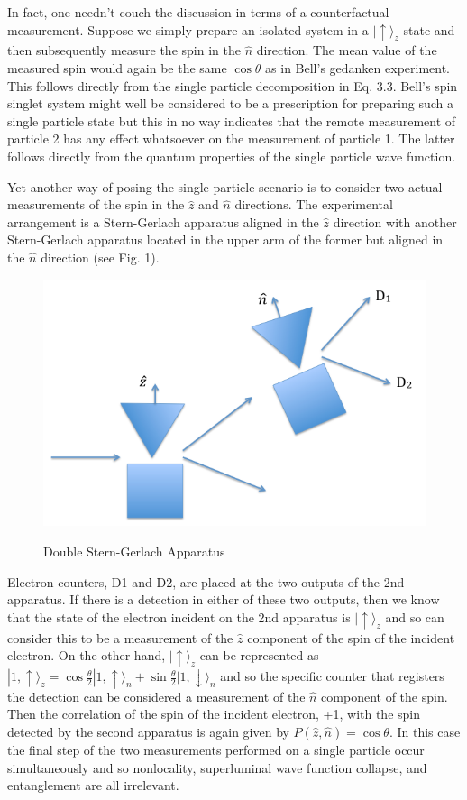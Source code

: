 \documentclass[12pt]{article}
\begin{document}
In fact, one needn't couch the discussion in terms of a counterfactual measurement.  Suppose we simply prepare an isolated system in a 
$|\!\!\uparrow\rangle_z$ state and then subsequently measure the spin in the $\hat{n}$ direction.  The mean value of the measured spin would again be the same $\cos{\theta}$ as in Bell's gedanken experiment.  This follows directly from the single particle decomposition in Eq. 3.3.  Bell's spin singlet system might well be considered to be a prescription for preparing such a single particle state but this in no way indicates that the remote measurement of particle 2 has any effect whatsoever on the measurement of particle 1.  The latter follows directly from the quantum properties of the single particle wave function.

Yet another way of posing the single particle scenario is to consider two actual measurements of the spin in the $\hat{z}$ and $\hat{n}$ directions.  The experimental arrangement is a Stern-Gerlach apparatus aligned in the $\hat{z}$ direction with another Stern-Gerlach apparatus located in the upper arm of the former but aligned in the $\hat{n}$ direction (see Fig. 1). 
\begin{figure}[htb]
\vbox{\hfil\scalebox{1.0}
{\includegraphics{Stern-Gerlach.pdf}}\hfil}
{\caption{\footnotesize{Double Stern-Gerlach Apparatus}}}
\end{figure}
Electron counters, D1 and D2, are placed at the two outputs of the 2nd apparatus.    If there is a detection in either of these two outputs, then we know that the state of the electron incident on the 2nd apparatus is $|\!\!\uparrow \rangle_z$ and so can consider this to be a measurement of the $\hat{z}$ component of the spin of the incident electron.  On the other hand, $|\!\!\uparrow \rangle_z$ can be represented as $|1,\uparrow \rangle_z = \cos{\frac{\theta}{2}} |1,\uparrow \rangle_n + \sin{\frac{\theta}{2}} |1,\downarrow \rangle_n$ and so the specific counter that registers the detection can be considered a measurement of the $\hat{n}$ component of the spin.  Then the correlation of the spin of the incident electron, +1, with the spin detected by the second apparatus is again given by $P(\hat{z},\hat{n})=\cos \theta$.  In this case the final step of the two measurements performed on a single particle occur simultaneously and so nonlocality, superluminal wave function collapse, and entanglement are all irrelevant.
\end{document}
